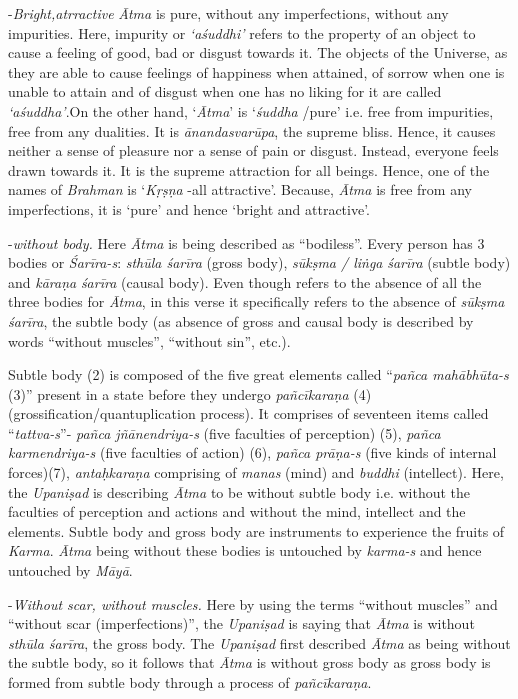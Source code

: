 -\emph{Bright,atrractive} \emph{Ātma} is pure, without any imperfections, without any impurities. Here, impurity or \emph{`aśuddhi'} refers to the property of an object to cause a feeling of good, bad or disgust towards it. The objects of the Universe, as they are able to cause feelings of happiness when attained, of sorrow when one is unable to attain and of disgust when one has no liking for it are called \emph{`aśuddha'}.On the other hand, `\emph{Ātma}' is `\emph{śuddha} /pure' i.e. free from impurities, free from any dualities. It is \emph{ānandasvarūpa}, the supreme bliss. Hence, it causes neither a sense of pleasure nor a sense of pain or disgust. Instead, everyone feels drawn towards it. It is the supreme attraction for all beings. Hence, one of the names of \emph{Brahman} is `\emph{Kṛṣṇa} -all attractive'. Because, \emph{Ātma} is free from any imperfections, it is `pure' and hence `bright and attractive'.
\vskip 1.5pt

-\emph{without body.} Here \emph{Ātma} is being described as ``bodiless''. Every person has 3 bodies or \emph{Śarīra-s}: \emph{sthūla śarīra} (gross body), \emph{sūkṣma / liṅga} \emph{śarīra} (subtle body) and \emph{kāraṇa} \emph{śarīra} (causal body). Even though  refers to the absence of all the three bodies for \emph{Ātma}, in this verse it specifically refers to the absence of \emph{sūkṣma śarīra}, the subtle body (as absence of gross and causal body is described by words ``without muscles'', ``without sin'', etc.).
\vskip 1.5pt

Subtle body (2) is composed of the five great elements called ``\emph{pañca mahābhūta-s} (3)'' present in a state before they undergo \emph{pañcīkaraṇa} (4) (grossification/quantuplication process). It comprises of seventeen items called ``\emph{tattva-s}''- \emph{pañca jñānendriya-s} (five faculties of perception) (5), \emph{pañca karmendriya-s} (five faculties of action) (6), \emph{pañca prāṇa-s} (five kinds of internal forces)(7), \emph{antaḥkaraṇa} comprising of \emph{manas} (mind) and \emph{buddhi} (intellect). Here, the \emph{Upaniṣad} is describing \emph{Ātma} to be without subtle body i.e. without the faculties of perception and actions and without the mind, intellect and the elements. Subtle body and gross body are instruments to experience the fruits of \emph{Karma}. \emph{Ātma} being without these bodies is untouched by \emph{karma-s} and hence untouched by \emph{Māyā}.
\vskip 1.5pt

-\emph{Without scar, without muscles.} Here by using the terms ``without muscles'' and ``without scar (imperfections)'', the \emph{Upaniṣad} is saying that \emph{Ātma} is without \emph{sthūla śarīra}, the gross body. The \emph{Upaniṣad} first described \emph{Ātma} as being without the subtle body, so it follows that \emph{Ātma} is without gross body as gross body is formed from subtle body through a process of \emph{pañcīkaraṇa}.

